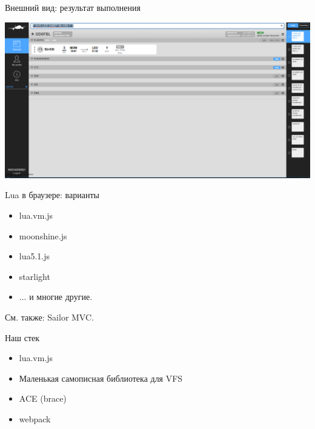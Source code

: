 \documentclass[aspectratio=169,handout,bigger]{beamer}
\begin{document}
\begin{frame}{Внешний вид: результат выполнения}

\includegraphics[width=.90\textwidth]{result}

\end{frame}


\begin{frame}{Lua в браузере: варианты}

\begin{itemize}
\item lua.vm.js
\item moonshine.js
\item lua5.1.js
\item starlight
\item ... и многие другие.
\end{itemize}

См. также: Sailor MVC.

\end{frame}


\begin{frame}{Наш стек}

\begin{itemize}
\item lua.vm.js
\item Маленькая самописная библиотека для VFS
\item ACE (brace)
\item webpack
\end{itemize}

\end{frame}

\end{document}
